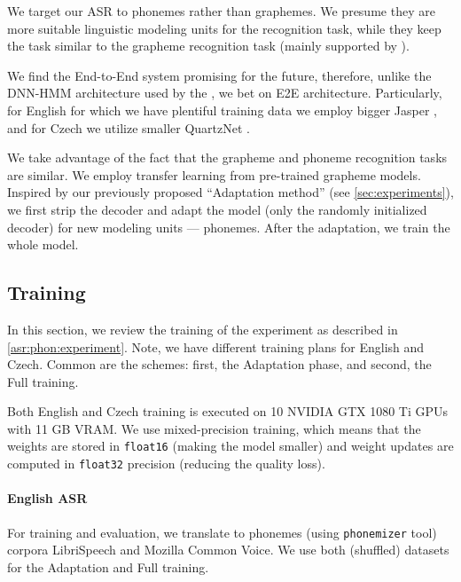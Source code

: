 We target our ASR to phonemes rather than graphemes. We presume they are more suitable linguistic modeling units for the recognition task, while they keep the task similar to the grapheme recognition task (mainly supported by  ). 

We find the End-to-End system promising for the future, therefore, unlike the DNN-HMM architecture used by the , we bet on E2E architecture. Particularly, for English for which we have plentiful training data we employ bigger Jasper , and for Czech we utilize smaller QuartzNet . 

We take advantage of the fact that the grapheme and phoneme recognition tasks are similar. We employ transfer learning from pre-trained grapheme models. Inspired by our previously proposed ``Adaptation method'' (see \cref{sec:experiments}), we first strip the decoder and adapt the model (only the randomly initialized decoder) for new modeling units --- phonemes. After the adaptation, we train the whole model.

\subsection{Training}
\label{asr:phon:training}
In this section, we review the training of the experiment as described in \cref{asr:phon:experiment}. Note, we have different training plans for English and Czech. Common are the schemes: first, the Adaptation phase, and second, the Full training.

Both English and Czech training is executed on 10 NVIDIA GTX 1080 Ti GPUs with 11 GB VRAM. We use mixed-precision training, which means that the weights are stored in \texttt{float16} (making the model smaller) and weight updates are computed in \texttt{float32} precision (reducing the quality loss).

\paragraph{English ASR}
For training and evaluation, we translate to phonemes (using \texttt{pho\-ne\-mi\-zer} tool) corpora LibriSpeech and Mozilla Common Voice. We use both (shuffled) datasets for the Adaptation and Full training.

